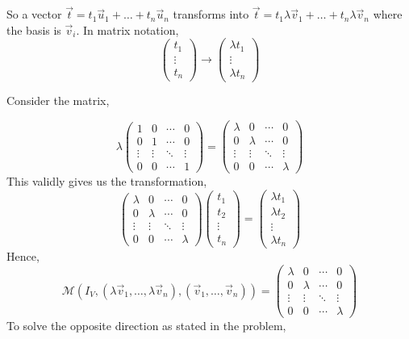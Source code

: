 \documentclass[letter]{article}
\begin{document}
So a vector $\vec{t} = t_1 \vec{u}_1 + \ldots + t_n \vec{u}_n$ transforms into 
$\vec{t} = t_1 \lambda \vec{v}_1 + \ldots + t_n \lambda \vec{v}_n$ where the basis is $\vec{v}_i$. In matrix notation,
\[
\begin{pmatrix} t_1 \\ \vdots \\ t_n \end{pmatrix} \to 
\begin{pmatrix} \lambda t_1 \\ \vdots \\\lambda t_n \end{pmatrix} 
\] 

Consider the matrix, 

\[  
{\lambda} 
\begin{pmatrix} 1 & 0 & \cdots & 0 \\ 
0 & 1 & \cdots & 0 \\
\vdots & \vdots & \ddots & \vdots \\
0 & 0 & \cdots & 1 \end{pmatrix}  = 
%
\begin{pmatrix} {\lambda} & 0 & \cdots & 0 \\ 
0 & {\lambda} & \cdots & 0 \\
\vdots & \vdots & \ddots & \vdots \\
0 & 0 & \cdots & {\lambda} \end{pmatrix}  
\]
This validly gives us the transformation, 
\[
\begin{pmatrix} {\lambda} & 0 & \cdots & 0 \\ 
0 & {\lambda} & \cdots & 0 \\
\vdots & \vdots & \ddots & \vdots \\
0 & 0 & \cdots & {\lambda} \end{pmatrix}   
\begin{pmatrix} t_1 \\t_2 \\ \vdots \\ t_n \end{pmatrix}  = 
\begin{pmatrix} \lambda t_1 \\ \lambda t_2\\ \vdots \\\lambda t_n \end{pmatrix} 
\]
Hence, 
\[
\mathcal M (I_V , \left(\lambda \vec{v}_1, \ldots, \lambda \vec{v}_n\right) , 
\left(\vec{v}_1, \ldots, \vec{v}_n\right)) = 
\begin{pmatrix} {\lambda} & 0 & \cdots & 0 \\ 
0 & {\lambda} & \cdots & 0 \\
\vdots & \vdots & \ddots & \vdots \\
0 & 0 & \cdots & {\lambda} \end{pmatrix}   
\]To solve the opposite direction as stated in the problem, 
\end{document}
